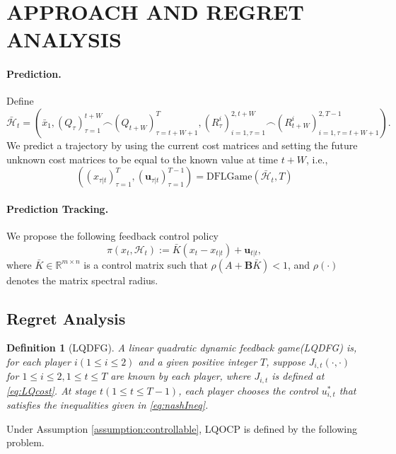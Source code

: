 \documentclass{article}
\newtheorem{definition}{Definition}
\begin{document}
\section{APPROACH AND REGRET ANALYSIS}
\paragraph{Prediction. } 
Define 
\begin{equation}
    \bar{\mathcal{H}}_{t} = (\bar{x}_{1}, (Q_{\tau})_{\tau=1}^{t+W} \frown(Q_{t+W})_{\tau=t+W+1}^{T}, (R_{\tau}^{i})_{i=1,\tau=1}^{2,t+W} \frown(R_{t+W}^{i})_{i=1,\tau=t+W+1}^{2,T-1}).
\end{equation}
We predict a trajectory by using the current cost matrices and setting the future unknown cost matrices to be equal to the known value at time $t+W$, i.e.,
\begin{equation}
    ((x_{\tau|t})_{\tau=1}^{T},(\mathbf{u}_{\tau|t})_{\tau=1}^{T-1}) = \text{DFLGame}(\bar{\mathcal{H}}_{t},T)
\end{equation}

\paragraph{Prediction Tracking. } We propose the following feedback control policy
\begin{equation}\label{eq:policy}
    \pi(x_{t},\mathcal{H}_{t}) := \bar{K}(x_{t}-x_{t|t}) + \mathbf{u}_{t|t},
\end{equation}
where $\bar{K}\in \mathbb{R}^{m\times n}$ is a control matrix such that $\rho(A+\mathbf{B}\bar{K}) < 1$, and $\rho(\cdot)$ denotes the matrix spectral radius.


\subsection{Regret Analysis}
\begin{definition}[LQDFG]
    A linear quadratic dynamic feedback game(LQDFG) is, for each player $i(1\leq i\leq 2)$ and a given positive integer $T$, suppose $J_{i,t}(\cdot,\cdot)$ for $1\leq i\leq 2,1\leq t\leq T$ are known by each player, where $J_{i,t}$ is defined at \eqref{eq:LQcost}. At stage $t(1\leq t\leq T-1)$, each player chooses the control $u_{i,t}^{*}$ that satisfies the inequalities given in \eqref{eq:nashIneq}. 
\end{definition}

Under Assumption \ref{assumption:controllable}, LQOCP is defined by the following problem.
\end{document}
